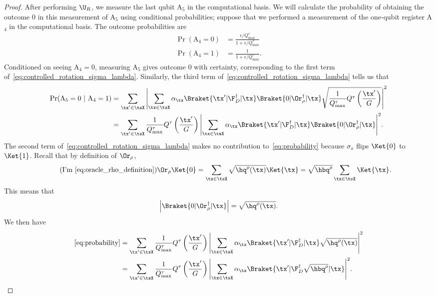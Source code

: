 \begin{proof}
  After performing $\U_R$, we measure the last qubit A$_5$ in the computational basis. We will calculate the probability of obtaining the outcome $0$ in this measurement of A$_5$ using conditional probabilities; suppose that we performed a measurement of the one-qubit register A$_4$ in the computational basis. The outcome probabilities are
  \begin{align}
    \label{eq:ancilla_a4_probs}
    \Pr(\text{A}_4=0) &= \frac{\epsilon/Q_{\max}^{\tau}}{1+\epsilon/Q_{\max}^{\tau}}\nonumber\\
    \Pr(\text{A}_4=1) &= \frac{1}{1+\epsilon/Q_{\max}^{\tau}}.
  \end{align} 
  Conditioned on seeing $\text{A}_4=0$, measuring A$_5$ gives outcome $0$ with certainty, corresponding to the first term of~\cref{eq:controlled_rotation_sigma_lambda}.
  Similarly, the third term of~\cref{eq:controlled_rotation_sigma_lambda} tells us that
  \begin{align}
    \label{eq:probability}
    \Pr(\text{A}_5=0~|~\text{A}_4=1)&=\sum_{\tx'\in\tsX}{\left|\sum_{\tx\in\tsX}\alpha_{\tx}\Braket{\tx'|\F_{D}^\dag|\tx}\Braket{0|\Or_\rho^\dag|\tx}\sqrt{\frac{1}{Q_{\max}^{\tau}}Q^{\tau}\left(\frac{\tx'}{G}\right)}\right|}^2\nonumber\\
    &=\sum_{\tx'\in\tsX}\frac{1}{Q_{\max}^{\tau}}Q^{\tau}\left(\frac{\tx'}{G}\right){\left|\sum_{\tx\in\tsX}\alpha_{\tx}\Braket{\tx'|\F_{D}^\dag|\tx}\Braket{0|\Or_\rho^\dag|\tx}\right|}^2.
  \end{align}
  The second term of~\cref{eq:controlled_rotation_sigma_lambda} makes no contribution to~\cref{eq:probability} because $\sigma_x$ flips $\Ket{0}$ to $\Ket{1}$. 
  Recall that by definition of $\Or_\rho$,
  \begin{equation*}
  \tag{I'm \ref{eq:oracle_rho_definition}}
  \Or_\rho\Ket{0}=\sum_{\tx\in\tsX}\sqrt{\hq^{\rho}(\tx)}\Ket{\tx}
  =\sqrt{\hbq^{\rho}}\sum_{\tx\in\tsX}\Ket{\tx}.
  \end{equation*}
  This means that  $${\left|\Braket{0|\Or_\rho^\dag|\tx}\right|}=\sqrt{\hq^{\rho}(\tx)}.$$ We then have  
  \begin{align}
    \label{eq:probability2}\cref{eq:probability}&=\sum_{\tx'\in\tsX}\frac{1}{Q_{\max}^{\tau}}Q^{\tau}\left(\frac{\tx'}{G}\right){\left|\sum_{\tx\in\tsX}\alpha_{\tx}\Braket{\tx'|\F_{D}^\dag|\tx}\sqrt{\hq^{\rho}(\tx)}\right|}^2\nonumber\\
    &=\sum_{\tx'\in\tsX}\frac{1}{Q_{\max}^{\tau}}Q^{\tau}\left(\frac{\tx'}{G}\right){\left|\sum_{\tx\in\tsX}\alpha_{\tx}\Braket{\tx'|\F_{D}^\dag\sqrt{\hbq^{\rho}}|\tx}\right|}^2.

\end{align}
\end{proof}
